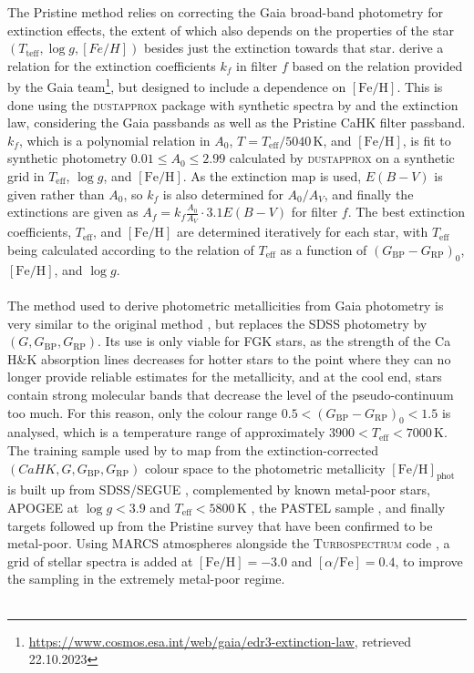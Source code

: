 \documentclass[a4paper,11pt]{article}
\begin{document}
The Pristine method relies on correcting the Gaia broad-band photometry for extinction effects, the extent of which also depends on the properties of the star $(T_\mathrm{teff},\log{g},[Fe/H])$ besides just the extinction towards that star. \citet{pristinegaia} derive a relation for the extinction coefficients $k_f$ in filter $f$ based on the relation provided by the Gaia team\footnote{\url{https://www.cosmos.esa.int/web/gaia/edr3-extinction-law}, retrieved 22.10.2023}, but designed to include a dependence on $\mathrm{[Fe/H]}$. This is done using the \textsc{dustapprox} package \citep{dustapprox} with synthetic spectra by \citet{castelli03} and the \citet{fitzpatrick99} extinction law, considering the \citet{riello21} Gaia passbands as well as the Pristine CaHK filter passband. $k_f$, which is a polynomial relation in $A_0$, $T=T_\mathrm{eff}/5040$\,K, and $\mathrm{[Fe/H]}$, is fit to synthetic photometry $0.01\leq A_0\leq2.99$ calculated by \textsc{dustapprox} on a synthetic grid in $T_\mathrm{eff}$, $\log{g}$, and $\mathrm{[Fe/H]}$. As the \citet{schlegel98} extinction map is used, $E(B-V)$ is given rather than $A_0$, so $k_f$ is also determined for $A_0/A_V$, and finally the extinctions are given as $A_f=k_f\frac{A_0}{A_V}\cdot3.1E(B-V)$ for filter $f$. The best extinction coefficients, $T_\mathrm{eff}$, and $\mathrm{[Fe/H]}$ are determined iteratively for each star, with $T_\mathrm{eff}$ being calculated according to the \citet{casagrande21} relation of $T_\mathrm{eff}$ as a function of $(G_\mathrm{BP}-G_\mathrm{RP})_0$, $\mathrm{[Fe/H]}$, and $\log{g}$.\\ \\
%
The method used to derive photometric metallicities from Gaia photometry is very similar to the original method \citep{pristine}, but replaces the SDSS photometry by $(G,G_\mathrm{BP},G_\mathrm{RP})$. Its use is only viable for FGK stars, as the strength of the Ca H\&K absorption lines decreases for hotter stars to the point where they can no longer provide reliable estimates for the metallicity, and at the cool end, stars contain strong molecular bands that decrease the level of the pseudo-continuum too much. For this reason, only the colour range $0.5<(G_\mathrm{BP}-G_\mathrm{RP})_0<1.5$ is analysed, which is a temperature range of approximately $3900<T_\mathrm{eff}<7000$\,K. The training sample used by \citet{pristinegaia} to map from the extinction-corrected $(CaHK,G,G_\mathrm{BP},G_\mathrm{RP})$ colour space to the photometric metallicity $\mathrm{[Fe/H]}_\mathrm{phot}$ is built up from SDSS/SEGUE \citep{segue,smee13}, complemented by known metal-poor stars, APOGEE at $\log{g}<3.9$ and $T_\mathrm{eff}<5800$\,K \citep{apogee,sdss17,wilson19}, the PASTEL sample \citep{soubiran16}, and finally targets followed up from the Pristine survey that have been confirmed to be metal-poor. Using \textsc{MARCS} atmospheres \citep{marcs} alongside the \textsc{Turbospectrum} code \citep{turbospectrum}, a grid of stellar spectra is added at $\mathrm{[Fe/H]}=-3.0$ and $[\alpha/\mathrm{Fe}]=0.4$, to improve the sampling in the extremely metal-poor regime.\\ \\
\end{document}

